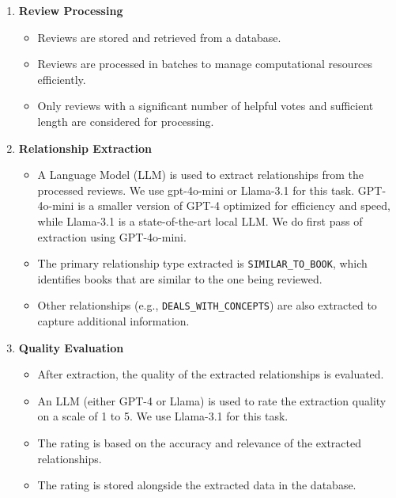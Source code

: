 \documentclass{article}
\begin{document}
\begin{enumerate}
      \item \textbf{Review Processing}
            \begin{itemize}
                  \item Reviews are stored and retrieved from a database.
                  \item Reviews are processed in batches to manage
                        computational
                        resources efficiently.
                  \item Only reviews with a significant number of helpful votes
                        and
                        sufficient length are considered for processing.
            \end{itemize}

      \item \textbf{Relationship Extraction}
            \begin{itemize}
                  \item A Language Model (LLM) is used to extract relationships
                        from
                        the processed reviews. We use gpt-4o-mini or Llama-3.1 for this task. GPT-4o-mini is a smaller version of GPT-4 optimized for 
                        efficiency and speed, while Llama-3.1 is a state-of-the-art local LLM. We do first pass of extraction using GPT-4o-mini.
                  \item The primary relationship type extracted is
                        \texttt{SIMILAR\_TO\_BOOK}, which identifies books that
                        are similar to the one
                        being reviewed.
                  \item Other relationships (e.g.,
                        \texttt{DEALS\_WITH\_CONCEPTS}) are also extracted to
                        capture
                        additional information.

            \end{itemize}

      \item \textbf{Quality Evaluation}
            \begin{itemize}
                  \item After extraction, the quality of the extracted
                        relationships is
                        evaluated.
                  \item An LLM (either GPT-4 or Llama) is used to rate the
                        extraction
                        quality on a scale of 1 to 5. We use Llama-3.1 for this task.
                  \item The rating is based on the accuracy and relevance of
                        the
                        extracted relationships.
                  \item The rating is stored alongside the extracted data in
                        the
                        database.
            \end{itemize}


\end{enumerate}
\end{document}
